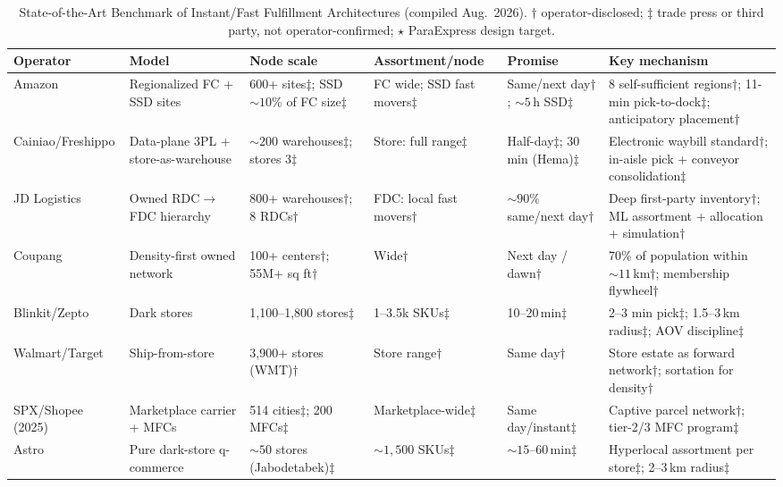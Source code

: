 \documentclass[10pt,twocolumn,letterpaper]{article}
\theoremstyle{definition}
\begin{document}
\begin{table}[t]
\caption{State-of-the-Art Benchmark of Instant/Fast Fulfillment Architectures (compiled Aug.\ 2026). $\dagger$ operator-disclosed; $\ddagger$ trade press or third party, not operator-confirmed; $\star$ ParaExpress design target.}
\label{tab:bench}
\centering\footnotesize
\begin{tabular}{@{}p{1.9cm}p{2.6cm}p{2.9cm}p{2.0cm}p{2.2cm}p{4.0cm}@{}}
\toprule
\textbf{Operator} & \textbf{Model} & \textbf{Node scale} & \textbf{Assortment/node} & \textbf{Promise} & \textbf{Key mechanism}\\
\midrule
Amazon & Regionalized FC + SSD sites & 600+ sites$\ddagger$; SSD ${\sim}10\%$ of FC size$\ddagger$ & FC wide; SSD fast movers$\ddagger$ & Same/next day$\dagger$; ${\sim}5$\,h SSD$\ddagger$ & 8 self-sufficient regions$\dagger$; 11-min pick-to-dock$\ddagger$; anticipatory placement$\dagger$\\
Cainiao/Freshippo & Data-plane 3PL + store-as-warehouse & ${\sim}200$ warehouses$\ddagger$; stores 3$\ddagger$ & Store: full range$\ddagger$ & Half-day$\ddagger$; 30\,min (Hema)$\ddagger$ & Electronic waybill standard$\dagger$; in-aisle pick + conveyor consolidation$\ddagger$\\
JD Logistics & Owned RDC$\to$FDC hierarchy & 800+ warehouses$\dagger$; 8 RDCs$\dagger$ & FDC: local fast movers$\dagger$ & ${\sim}90\%$ same/next day$\dagger$ & Deep first-party inventory$\dagger$; ML assortment + allocation + simulation$\dagger$\\
Coupang & Density-first owned network & 100+ centers$\dagger$; 55M+ sq ft$\dagger$ & Wide$\dagger$ & Next day / dawn$\dagger$ & 70\% of population within ${\sim}11$\,km$\dagger$; membership flywheel$\dagger$\\
Blinkit/Zepto & Dark stores & 1,100--1,800 stores$\ddagger$ & 1--3.5k SKUs$\ddagger$ & 10--20\,min$\ddagger$ & 2--3 min pick$\ddagger$; 1.5--3\,km radius$\ddagger$; AOV discipline$\ddagger$\\
Walmart/Target & Ship-from-store & 3,900+ stores (WMT)$\dagger$ & Store range$\dagger$ & Same day$\dagger$ & Store estate as forward network$\dagger$; sortation for density$\dagger$\\
SPX/Shopee (2025) & Marketplace carrier + MFCs & 514 cities$\ddagger$; 200 MFCs$\ddagger$ & Marketplace-wide$\ddagger$ & Same day/instant$\ddagger$ & Captive parcel network$\dagger$; tier-2/3 MFC program$\ddagger$\\
Astro & Pure dark-store q-commerce & ${\sim}50$ stores (Jabodetabek)$\ddagger$ & ${\sim}1{,}500$ SKUs$\ddagger$ & ${\sim}15$--60\,min$\ddagger$ & Hyperlocal assortment per store$\ddagger$; 2--3\,km radius$\ddagger$\\

\end{tabular}
\end{table}
\end{document}
